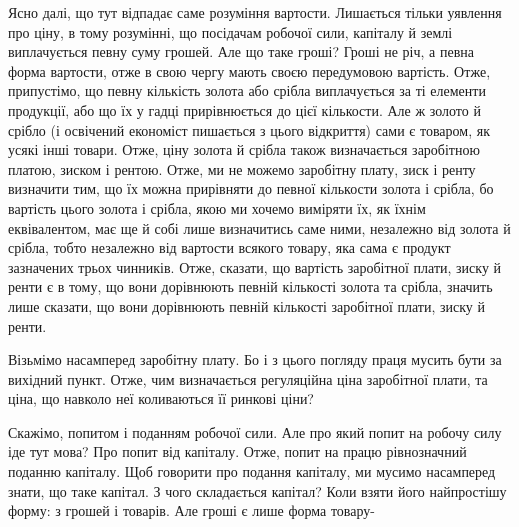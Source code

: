 Ясно далі, що тут відпадає саме розуміння вартости. Лишається тільки
уявлення про ціну, в тому розумінні, що посідачам робочої сили, капіталу
й землі виплачується певну суму грошей. Але що таке гроші? Гроші не річ,
а певна форма вартости, отже в свою чергу мають своєю передумовою вартість.
Отже, припустімо, що певну кількість золота або срібла виплачується за ті елементи
продукції, або що їх у гадці прирівнюється до цієї кількости. Але ж
золото й срібло (і освічений економіст пишається з цього відкриття) сами є
товаром, як усякі інші товари. Отже, ціну золота й срібла також визначається
заробітною платою, зиском і рентою. Отже, ми не можемо заробітну плату, зиск
і ренту визначити тим, що їх можна прирівняти до певної кількости золота
і срібла, бо вартість цього золота і срібла, якою ми хочемо виміряти їх, як їхнім
еквівалентом, має ще й собі лише визначитись саме ними, незалежно від золота
й срібла, тобто незалежно від вартости всякого товару, яка сама є продукт зазначених
трьох чинників. Отже, сказати, що вартість заробітної плати, зиску
й ренти є в тому, що вони дорівнюють певній кількості золота та срібла, значить
лише сказати, що вони дорівнюють певній кількості заробітної плати,
зиску й ренти.

Візьмімо насамперед заробітну плату. Бо і з цього погляду праця мусить
бути за вихідний пункт. Отже, чим визначається регуляційна ціна заробітної
плати, та ціна, що навколо неї коливаються її ринкові ціни?

Скажімо, попитом і поданням робочої сили. Але про який попит на робочу
силу іде тут мова? Про попит від капіталу. Отже, попит на працю рівнозначний
поданню капіталу. Щоб говорити про подання капіталу, ми мусимо
насамперед знати, що таке капітал. З чого складається капітал? Коли взяти
його найпростішу форму: з грошей і товарів. Але гроші є лише форма товару-
\parbreak{}  %
